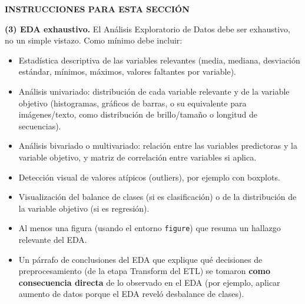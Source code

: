 \documentclass[pdflatex,sn-mathphys-num]{sn-jnl}
\newenvironment{instruccion}{%
  \par\noindent\textbf{\color{blue!55!black}INSTRUCCIONES PARA ESTA SECCIÓN}%
  \par\vspace{2pt}\noindent\itshape\small
}{%
  \par\normalfont\vspace{6pt}
}
\begin{document}
\begin{instruccion}
\textbf{(3) EDA exhaustivo.} El Análisis Exploratorio de Datos debe ser exhaustivo, no un simple vistazo. Como mínimo debe incluir:
\begin{itemize}
\item Estadística descriptiva de las variables relevantes (media, mediana, desviación estándar, mínimos, máximos, valores faltantes por variable).
\item Análisis univariado: distribución de cada variable relevante y de la variable objetivo (histogramas, gráficos de barras, o su equivalente para imágenes/texto, como distribución de brillo/tamaño o longitud de secuencias).
\item Análisis bivariado o multivariado: relación entre las variables predictoras y la variable objetivo, y matriz de correlación entre variables si aplica.
\item Detección visual de valores atípicos (outliers), por ejemplo con boxplots.
\item Visualización del balance de clases (si es clasificación) o de la distribución de la variable objetivo (si es regresión).
\item Al menos una figura (usando el entorno \texttt{figure}) que resuma un hallazgo relevante del EDA.
\item Un párrafo de conclusiones del EDA que explique qué decisiones de preprocesamiento (de la etapa Transform del ETL) se tomaron \textbf{como consecuencia directa} de lo observado en el EDA (por ejemplo, aplicar aumento de datos porque el EDA reveló desbalance de clases).
\end{itemize}
\end{instruccion}
\end{document}
